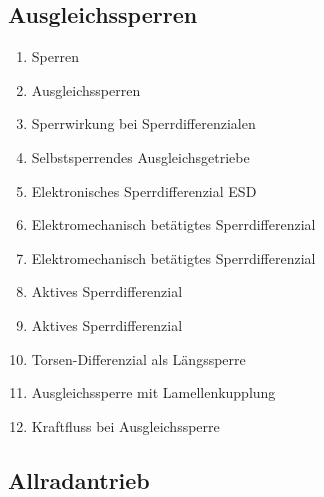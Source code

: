 \subsection{Ausgleichssperren}\label{ausgleichssperren}

\begin{enumerate}
\item
  Sperren\\
\item
  Ausgleichssperren\\
\item
  Sperrwirkung bei Sperrdifferenzialen\\
\item
  Selbstsperrendes Ausgleichsgetriebe\\
\item
  Elektronisches Sperrdifferenzial ESD\\
\item
  Elektromechanisch betätigtes Sperrdifferenzial\\
\item
  Elektromechanisch betätigtes Sperrdifferenzial\\
\item
  Aktives Sperrdifferenzial\\
\item
  Aktives Sperrdifferenzial\\
\item
  Torsen-Differenzial als Längssperre\\
\item
  Ausgleichssperre mit Lamellenkupplung\\
\item
  Kraftfluss bei Ausgleichssperre
\end{enumerate}

\subsection{Allradantrieb}\label{allradantrieb}

